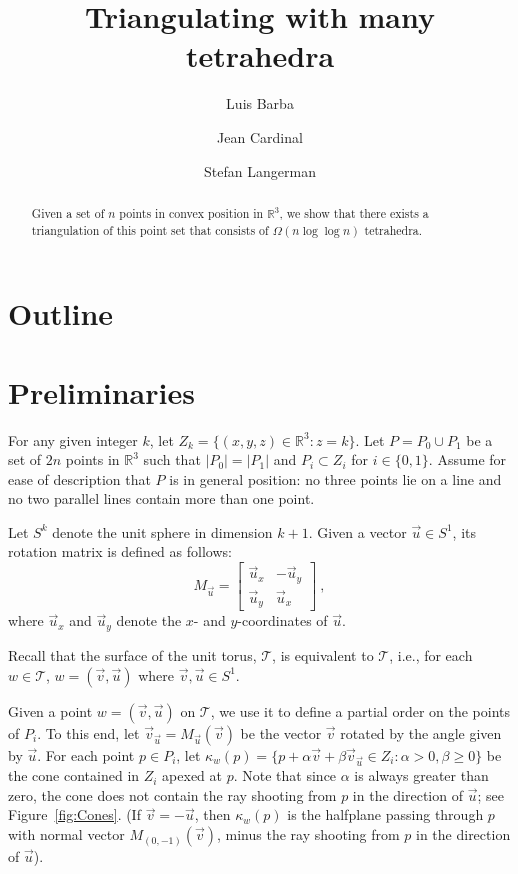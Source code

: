 \documentclass[a4paper, 11pt]{article}
\newcommand{\ve}{{\ensuremath{\vec{v}}}}
\newcommand{\ue}{{\ensuremath{\vec{u}}}}
\newcommand{\we}{{\ensuremath{w}}}
\newcommand{\cone}[1]{\ensuremath{\kappa_{\we}(#1)}}
\newcommand{\torus}{\ensuremath{\mathcal T}}
\begin{document}
\title{Triangulating with many tetrahedra}





\author{Luis Barba \and Jean Cardinal \and Stefan Langerman
}
\date{}

\maketitle
\begin{abstract}
Given a set of $n$ points in convex position in $\mathbb{R}^3$, we show that there exists a triangulation of this point set that consists of $\Omega(n \log\log n)$ tetrahedra.
\end{abstract}



\section{Outline}
\section{Preliminaries}
For any given integer $k$, let $Z_k = \{(x,y,z) \in \mathbb{R}^3 : z = k\}$.
Let $P = P_0\cup P_1$ be a set of $2n$ points in $\mathbb{R}^3$ such that $|P_0|= |P_1|$ and $P_i\subset Z_i$ for $i\in \{0, 1\}$.
Assume for ease of description that $P$ is in general position: 
no three points lie on a line and no two parallel lines contain more than one point. 

Let $S^k$ denote the unit sphere in dimension $k+1$.
Given a vector $\ue\in S^1$, its rotation matrix is defined as follows: 
$$M_\ue = \left[ \begin{array}{lr} \ue_x & -\ue_y \\ \ue_y & \ue_x \end{array} \right]\ ,$$
where $\ue_x$ and $\ue_y$ denote the $x$- and $y$-coordinates of $\ue$.

Recall that the surface of the unit torus, $\torus$, is equivalent to $\torus$, i.e., for each $\we\in \torus$, $\we = (\ve, \ue)$ where $\ve, \ue\in S^1$.

Given a point $\we = (\ve, \ue)$ on $\torus$, we use it to define a partial order on the points of $P_i$.
To this end, let $\ve_\ue = M_\ue (\ve)$ be the vector $\ve$ rotated by the angle given by $\ue$.
For each point $p\in P_i$, let $\cone{p} = \{ p  + \alpha \ve + \beta \ve_\ue \in Z_i : \alpha > 0, \beta \geq 0\}$ be the cone contained in $Z_i$ apexed at $p$. 
Note that since $\alpha$ is always greater than zero, the cone does not contain the ray shooting from $p$ in the direction of $\ue$; see Figure~\ref{fig:Cones}. (If $\ve = -\ue$, then $\cone{p}$ is the halfplane passing through $p$ with normal vector $M_{(0, -1)}(\ve)$, minus the ray shooting from $p$ in the direction of $\ue$).
\end{document}
